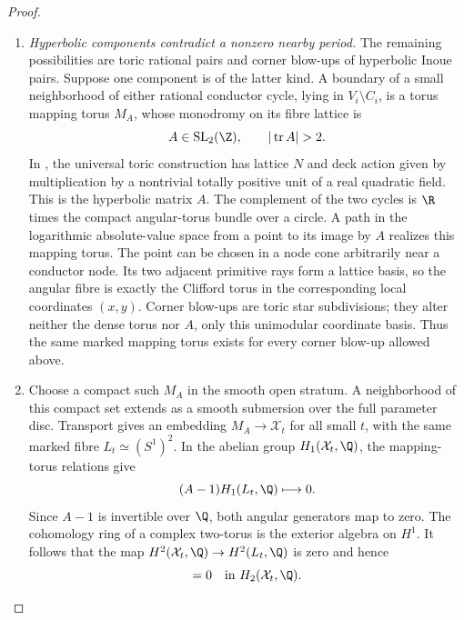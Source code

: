\begin{proof}
\begin{enumerate}[label=\arabic*.,leftmargin=*]
\item \emph{Hyperbolic components contradict a nonzero nearby period.}
The remaining possibilities are toric rational pairs
and corner blow-ups of hyperbolic Inoue pairs. Suppose
one component is of the latter kind. A boundary of a
small neighborhood of either rational conductor cycle,
lying in $V_i\setminus C_i$, is a torus mapping torus
$M_A$, whose monodromy on its fibre lattice is
\begin{equation}
 A\in\operatorname{SL}_2(\Z),\qquad
 |\operatorname{tr}A|>2.
\label{pub:I:eq:B-4-28-6}
\end{equation}
In
\citet[Section 15, Theorem 15.1 and the following
paragraph, retypeset pp.~130--131]{Oda1978D}, the universal
toric construction has lattice $N$ and deck action
given by multiplication by a nontrivial totally
positive unit of a real quadratic field. This is
the hyperbolic matrix $A$. The complement of the
two cycles is $\R$ times the compact angular-torus
bundle over a circle. A path in the logarithmic
absolute-value space from a point to its image by
$A$ realizes this mapping torus. The point can be
chosen in a node cone arbitrarily near a conductor
node. Its two adjacent primitive rays form a lattice
basis, so the angular fibre is exactly the Clifford
torus in the corresponding local coordinates
$(x,y)$. Corner blow-ups are toric star subdivisions;
they alter neither the dense torus nor $A$, only
this unimodular coordinate basis. Thus the same
marked mapping torus exists for every corner
blow-up allowed above.

\item Choose a compact such $M_A$ in the smooth open stratum.
A neighborhood of this compact set extends as a
smooth submersion over the full parameter disc.
Transport gives an embedding $M_A\to\mathcal X_t$ for
all small $t$, with the same marked fibre $L_t\simeq
(S^1)^2$. In the abelian group
$H_1(\mathcal X_t,\Q)$, the mapping-torus relations give
\[
 (A-1)H_1(L_t,\Q)\longmapsto0.
\]
Since $A-1$ is invertible over $\Q$, both angular
generators map to zero. The cohomology ring of a
complex two-torus is the exterior algebra on $H^1$.
It follows that the map $H^2(\mathcal X_t,\Q)\to
H^2(L_t,\Q)$ is zero and hence
\begin{equation}
 [L_t]=0\quad\hbox{in }H_2(\mathcal X_t,\Q).
\label{pub:I:eq:B-4-28-7}
\end{equation}


\end{enumerate}
\end{proof}
